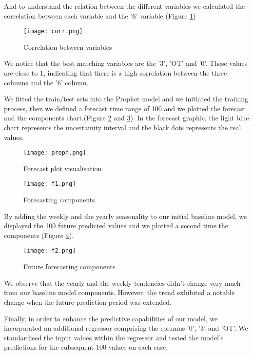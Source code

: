 \documentclass[10pt]{article}
\begin{document}
\newpage
\begin{multicols}{2}

And to understand the relation between the different variables we calculated the correlation between each variable and the '6' variable (Figure \ref{f22})

\begin{figure}[H]
\texttt{[image: corr.png]}
    \caption{Correlation between variables}
\label{f22}
\end{figure}

We notice that the best matching variables are the '3', 'OT' and '0'.\newline
These values are close to 1, indicating that there is a high correlation between the three columns and the '6' column.

We fitted the train/test sets into the Prophet model and we initiated the training process, then we defined a forecast time range of 100 and we plotted the forecast and the components chart.(Figure \ref{f23} and \ref{f24}). \newline
In the forecast graphic, the light blue chart represents the uncertainity interval and the black dots represents the real values.


\begin{figure}[H]
\centering
\texttt{[image: proph.png]}
\caption{Forecast plot visualisation}
\label{f23}
\end{figure}

\begin{figure}[H]
\centering
\texttt{[image: f1.png]}
\caption{Forecasting components}
\label{f24}
\end{figure}

By adding the weekly and the yearly seasonality to our initial baseline model, we displayed the 100 future predicted values and we plotted a second time the components (Figure \ref{f25}).


\begin{figure}[H]
\centering
\texttt{[image: f2.png]}
\caption{Future forecasting components}
\label{f25}
\end{figure}

We observe that the yearly and the weekly tendencies didn't change very much from our baseline model components. However, the trend exhibited a notable change when the future prediction period was extended.

Finally, in order to enhance the predictive capabilities of our model, we incorporated an additional regressor comprising the columns '0', '3' and 'OT'. We standardised the input values within the regressor and tested the model's predictions for the subsequent 100 values on each case.



\end{multicols}
\end{document}
